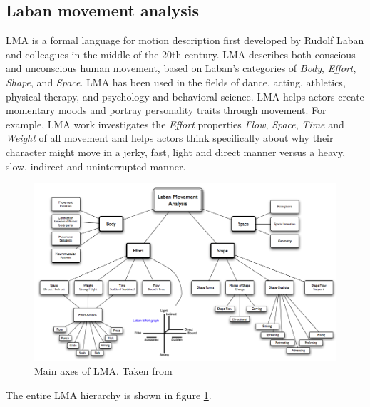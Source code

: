\documentclass[11pt,twocolumn,varwidth=true,a4paper,fleqn]{article}
\begin{document}
\subsection{Laban movement analysis}
LMA is a formal language for motion description first developed by Rudolf Laban \cite{Laban} and colleagues in the middle of the 20th century. 
LMA describes both conscious and unconscious human movement, based on Laban's categories of \textit{Body}, \textit{Effort}, \textit{Shape}, and \textit{Space}. 
LMA has been used in the fields of dance, acting, athletics, physical therapy, and psychology and behavioral science.
LMA helps actors create momentary moods and portray personality traits through
movement. For example, LMA work investigates the \textit{Effort} properties
\textit{Flow}, \textit{Space}, \textit{Time} and \textit{Weight} of all movement and helps actors 
think specifically about why their character might move in a jerky, fast, light and direct manner 
versus a heavy, slow, indirect and uninterrupted manner.
\begin{figure}[ht]
\centering
\includegraphics[width=\textwidth]{laban.png}
\caption{Main axes of LMA. Taken from \cite{labanTree}}
\label{labanTree}
\end{figure}
The entire LMA hierarchy is shown in figure \ref{labanTree}.
\end{document}
